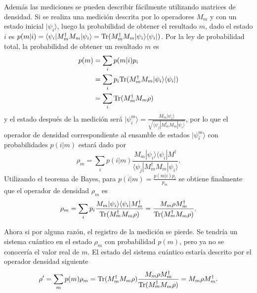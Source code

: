 Además las mediciones se pueden describir fácilmente utilizando matrices de densidad. Si se realiza una medición descrita por lo operadores $M_m$ y con un estado inicial $|\psi_i\rangle$, luego la probabilidad de obtener el resultado $m$, dado el estado $i$ es $p(m|i)=\langle \psi_i|M_m^{\dagger}M_m|\psi_i\rangle = {\rm Tr}(M_m^{\dagger} M_m |\psi_i\rangle \langle\psi_i|)$. Por la ley de probabilidad total,
 la probabilidad de
obtener un resultado $m$ es {\cite{nielsen_chuang_2010}}
\begin{equation}
	\label{probabilidad_m}
	\begin{split}
	p(m) &= \sum_{i}p(m|i)p_i\\
	&=\sum_i p_i{\rm Tr}(M_m^{\dagger} M_m |\psi_i\rangle \langle\psi_i|)\\
	&=\sum_{i}{\rm Tr}(M_m^{\dagger} M_m \rho)
	\end{split}
\end{equation} y el estado después de la medición será $|\psi_i^m\rangle=\frac{M_m|\psi_i\rangle}{\sqrt{\langle\psi_j|M_m^{\dagger}M_m|\psi_i\rangle}}$, por lo que el operador de densidad correspondiente al ensamble de estados $|\psi_i^m\rangle$ con probabilidades $p(i|m)$ estará dado por \[\rho_m=\sum_i p(i|m)\frac{M_m|\psi_i\rangle \langle \psi_i|M^{\dagger}}{\langle\psi_j|M_m^{\dagger}M_m|\psi_i\rangle}.\] Utilizando el teorema de Bayes, para $p(i|m)=\frac{p(m|i)p_i}{p_m}$ se obtiene finalmente que el operador de densidad $\rho_m$ es {\cite{nielsen_chuang_2010}} \begin{equation}
	\rho_m=\sum_i p_i \dfrac{M_m|\psi_i\rangle \langle \psi_i|M_m^{\dagger}}{{\rm Tr}(M^{\dagger}_m M_m \rho )}=\dfrac{M_m \rho M_m^{\dagger}}{{\rm Tr} (M^{\dagger}_m M_m\rho )}.
\end{equation}


Ahora si por alguna razón, el registro de la medición se pierde. Se tendría un sistema cuántico en el estado $\rho_m$ con probabilidad $p(m)$, pero ya no se conocería el valor real de $m$. El estado del sistema cuántico estaría descrito por el operador densidad siguiente \begin{equation}
	\rho'=\sum_m p(m)\rho_m={\rm Tr}(M^{\dagger}_m M_m\rho )\dfrac{M_m\rho M_m^{\dagger}}{{\rm Tr} (M^{\dagger}_m M_m \rho )}=M_m\rho M_m^{\dagger}.
\end{equation}


